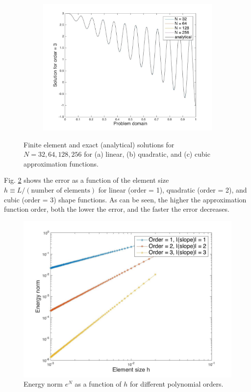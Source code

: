 \documentclass[10pt]{article}
\begin{document}
\begin{figure}[H]
\begin{subfigure}{.48\textwidth}
  \includegraphics[width=1.0\linewidth]{Nplot_for_order_3.jpg}
  \caption{}
\end{subfigure}
\caption{Finite element and exact (analytical) solutions for \(N=32, 64, 128, 256\) for (a) linear, (b) quadratic, and (c) cubic approximation functions.}
\label{fig:Nplots}
\end{figure}

Fig. \ref{fig:eN_vs_h} shows the error as a function of the element size \(h \equiv L/(\textrm{number of elements})\) for linear (order = 1), quadratic (order = 2), and cubic (order = 3) shape functions. As can be seen, the higher the approximation function order, both the lower the error, and the faster the error decreases. 

\begin{figure}[H]
  \centering
  \includegraphics[width=13cm]{eN_vs_h.jpg}
  \caption{Energy norm \(e^N\) as a function of \(h\) for different polynomial orders.}
  \label{fig:eN_vs_h}
\end{figure}
\end{document}
